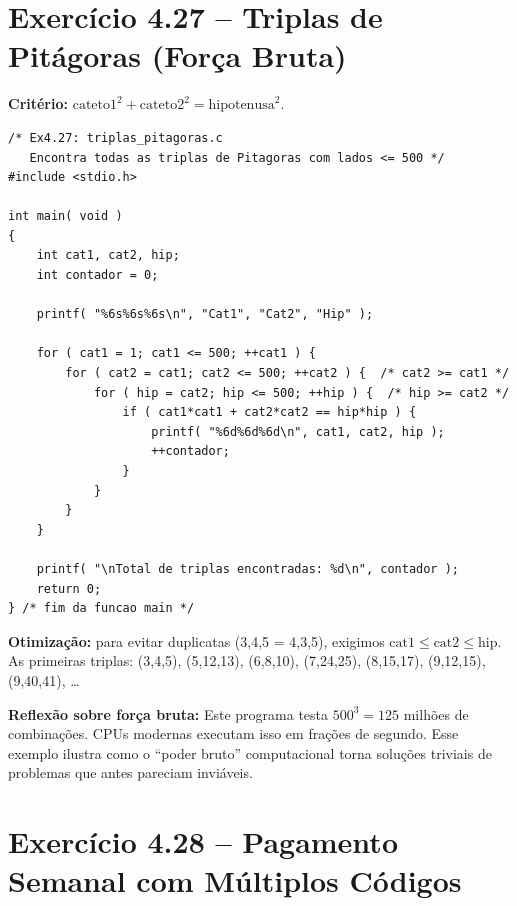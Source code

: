 \documentclass[12pt,a4paper]{article}
\begin{document}
\newpage

\section{Exercício 4.27 -- Triplas de Pitágoras (Força Bruta)}

\begin{respostabox}
\textbf{Critério:} $\text{cateto1}^2 + \text{cateto2}^2 = \text{hipotenusa}^2$.

\begin{lstlisting}
/* Ex4.27: triplas_pitagoras.c
   Encontra todas as triplas de Pitagoras com lados <= 500 */
#include <stdio.h>

int main( void )
{
    int cat1, cat2, hip;
    int contador = 0;

    printf( "%6s%6s%6s\n", "Cat1", "Cat2", "Hip" );

    for ( cat1 = 1; cat1 <= 500; ++cat1 ) {
        for ( cat2 = cat1; cat2 <= 500; ++cat2 ) {  /* cat2 >= cat1 */
            for ( hip = cat2; hip <= 500; ++hip ) {  /* hip >= cat2 */
                if ( cat1*cat1 + cat2*cat2 == hip*hip ) {
                    printf( "%6d%6d%6d\n", cat1, cat2, hip );
                    ++contador;
                }
            }
        }
    }

    printf( "\nTotal de triplas encontradas: %d\n", contador );
    return 0;
} /* fim da funcao main */
\end{lstlisting}

\textbf{Otimização:} para evitar duplicatas (3,4,5 = 4,3,5), exigimos
$\text{cat1} \leq \text{cat2} \leq \text{hip}$. As primeiras triplas:
(3,4,5), (5,12,13), (6,8,10), (7,24,25), (8,15,17), (9,12,15), (9,40,41), \ldots

\textbf{Reflexão sobre força bruta:} Este programa testa $500^3 = 125$ milhões de
combinações. CPUs modernas executam isso em frações de segundo. Esse exemplo
ilustra como o ``poder bruto'' computacional torna soluções triviais de problemas
que antes pareciam inviáveis.
\end{respostabox}

\section{Exercício 4.28 -- Pagamento Semanal com Múltiplos Códigos}
\end{document}
